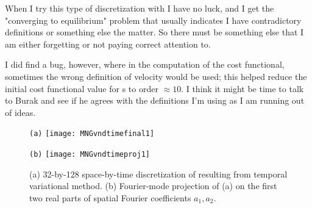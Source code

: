 \begin{description}
{\begin{description}
When I try this type of discretization with  I have no luck, and I get the "converging to equilibrium"
problem that usually indicates I have contradictory definitions or something else the matter.
So there must be something else that I am either forgetting or not paying correct attention to.

I did find a bug, however, where in the computation of the cost functional, sometimes the wrong
definition of velocity would be used; this helped reduce the initial cost functional value for
{\rpo}s to order $\approx 10$. I think it might be time to talk to Burak and see if he agrees
with the definitions I'm using as I am running out of ideas.
\end{description}
}

\begin{figure}[ht]
\begin{minipage}[height=.32\textheight]{.45\textwidth}
\centering \small{\texttt{(a)}}
\texttt{[image: MNGvndtimefinal1]}
\end{minipage}
\begin{minipage}[height=.32\textheight]{.45\textwidth}
\centering \small{\texttt{(b)}}
\texttt{[image: MNGvndtimeproj1]}
\end{minipage}
\caption{ \label{fig:MNGspacetime1}
(a) 32-by-128 space-by-time discretization of  resulting from
temporal variational method.
(b) Fourier-mode projection of (a) on the first two real parts of spatial
Fourier coefficients $a_1, a_2$.
}
\end{figure}

\end{description}
